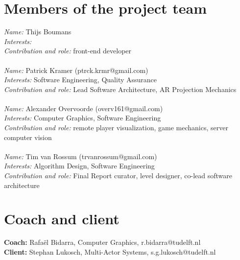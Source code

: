 \documentclass[]{article}
\begin{document}
\section*{Members of the project team}
\textit{Name:} Thijs Boumans\\
\textit{Interests:}\\
\textit{Contribution and role:} front-end developer \\
\\
\textit{Name:} Patrick Kramer (ptrck.krmr@gmail.com) \\
\textit{Interests:} Software Engineering, Quality Assurance \\
\textit{Contribution and role:} Lead Software Architecture, AR Projection Mechanics \\
\\
\textit{Name:} Alexander Overvoorde (overv161@gmail.com)\\
\textit{Interests:} Computer Graphics, Software Engineering\\
\textit{Contribution and role:} remote player visualization, game mechanics, server computer vision\\
\\
\textit{Name:} Tim van Rossum (trvanrossum@gmail.com)\\
\textit{Interests:} Algorithm Design, Software Engineering \\
\textit{Contribution and role:} Final Report curator, level designer, co-lead software architecture\\

\section*{Coach and client}
\textbf{Coach:} Rafa\"el Bidarra, Computer Graphics, r.bidarra@tudelft.nl\\
\textbf{Client:} Stephan Lukosch, Multi-Actor Systems, s.g.lukosch@tudelft.nl
\end{document}
